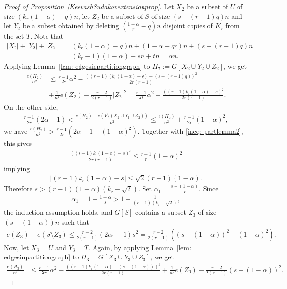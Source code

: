 \documentclass[11pt]{article}
\theoremstyle{definition}
\numberwithin{theo}{section}
\begin{document}
\begin{proof}[Proof of Proposition~\ref{KeevashSudakovextensionprop}]
Let $X_2$ be a subset of $U$ of size $(k_r(1-\alpha)-q)n$, let $Z_2$ be a subset of $S$ of size $(s-(r-1)q)n$ and let $Y_2$ be a subset obtained by deleting $(\frac{1-\alpha}{r}-q)n$
disjoint copies of $K_r$ from the set $T$. Note that
\begin{align*}
    |X_2| + |Y_2| + |Z_2|&=(k_r(1-\alpha)-q)n+(1-\alpha-qr)n+(s-(r-1)q)n\\&=(k_r-1)(1-\alpha)+sn+tn=\alpha n.
\end{align*} Applying Lemma~\ref{lem: edgesinpartitiongraph} to $H_2:=G[X_2\cup Y_2 \cup Z_2]$, we get
\begin{align}
\label{ineq: partlemma2}
\nonumber
    \frac{e(H_2)}{n^2}&\leq \frac{r-1}{2r}\alpha^2-\frac{((r-1)(k_r(1-\alpha)-q)-(s-(r-1)q))^2}{2r(r-1)}\\
    &+\frac{1}{n^2}e(Z_2)-\frac{r-2}{2(r-1)}|Z_2|^2= \frac{r-1}{2r}\alpha^2-\frac{((r-1)k_r(1-\alpha)-s)^2}{2r(r-1)}.
\end{align}
On the other side,  
\begin{align*}
    \frac{r-1}{2r}(2\alpha-1) < \frac{e(H_2)+e(V\setminus(X_2\cup Y_2 \cup Z_2))}{n^2} \leq \frac{e(H_2)}{n^2}+ \frac{r-1}{2r}(1-\alpha)^2,
\end{align*}
we have $\frac{e(H_2)}{n^2}>\frac{r-1}{2r}(2\alpha-1-(1-\alpha)^2)$. Together with \eqref{ineq: partlemma2}, this gives
\begin{align*}
   \frac{((r-1)k_r(1-\alpha)-s)^2}{2r(r-1)}\leq \frac{r-1}{r}(1-\alpha)^2
\end{align*}
implying
\begin{align*}
    \lvert (r-1)k_r(1-\alpha)-s\rvert\leq \sqrt{2}(r-1)(1-\alpha).
\end{align*}
Therefore $s>(r-1)(1-\alpha)(k_r-\sqrt{2})$. Set $\alpha_1=\frac{s-(1-\alpha)}{s}$. Since
\begin{align*}
    \alpha_1=1-\frac{1-\alpha}{s}>1-\frac{1}{(r-1)(k_r-\sqrt{2})},
\end{align*}
the induction assumption holds, and $G[S]$ contains a subset $Z_3$ of size $(s-(1-\alpha))n$ such that
\begin{align}
\label{ineq:edgeZ3+comp}
    e(Z_3)+e(S\setminus Z_3)\leq \frac{r-2}{2(r-1)}(2\alpha_1-1)s^2=\frac{r-2}{2(r-1)}((s-(1-\alpha))^2-(1-\alpha)^2).
\end{align}
Now, let $X_3=U$ and $Y_3=T$. Again, by applying Lemma~\ref{lem: edgesinpartitiongraph} to $H_3=G[X_3\cup Y_3\cup Z_3]$, we get
\begin{align}
\label{ineq: partlemma3}
    \frac{e(H_3)}{n^2}&\leq \frac{r-1}{2r}\alpha^2-\frac{((r-1)k_r(1-\alpha)-(s-(1-\alpha)))^2}{2r(r-1)}+\frac{1}{n^2}e(Z_3)-\frac{r-2}{2(r-1)}(s-(1-\alpha))^2.

\end{align}
\end{proof}
\end{document}
